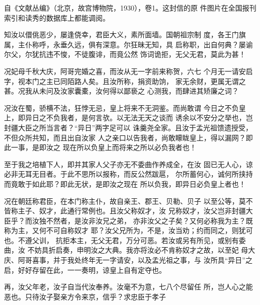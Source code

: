 \par
自《文献丛编》（北京，故宫博物院，1930），卷1。这封信的原%
件图片在全国报刊索引和读秀的数据库上都能调阅。%
\par
{\bookkai 知汝以儇佻恶少，屡逢侥幸，君臣大义，素所面墙。国朝祖宗制}%
{\bookkai 度，各王门旗属，主仆称呼，永垂久远，俱有深意。尔狂昧无知，具}%
{\bookkai 启称职，出自何典？屡谕尔父，尔犹抗违不悛，不徒腹诽，而竟公然}%
{\bookkai 饰词诡拒，无父无君，莫此为甚！}%
\par
{\bookkai 况妃母千秋大庆，阿哥完婚之喜，而汝从无一字前来称贺，六七}%
{\bookkai 个月无一请安启字，视本门之主已同陌路人矣。且汝所称，捐资助饷，}%
{\bookkai 家无余财，更属无谓之甚。况我从未问及汝家囊橐，汝何得以鄙亵之}%
{\bookkai 心测我，而肆进其矫廉之词？}%
\par
{\bookkai 况汝在蜀，骄横不法，狂悖无忌，皇上将来不无洞鉴。而尚敢谓}%
{\bookkai 今日之不负皇上，即异日之不负我者，是何言欤。以无法无天之谈而}%
{\bookkai 诱余以不安分之举也，岂封疆大臣之所当言者？“异日”两字足可以}%
{\bookkai 诛羹尧全家。且汝于孟光祖馈遗授受，不但众所共知，而且出自汝家}%
{\bookkai 人之亲口以告我者，尚敢矇眬皇上，得以漏网？即此一事，是即汝之}%
{\bookkai 现在所以负皇上而将来之所以必负我者也！}%
\par
{\bookkai 至于我之培植下人，即并其家人父子亦无不委曲作养成全，在汝}%
{\bookkai 固已无人心，谅必非无耳无目者。于此不思所以报称，而反公然跋扈，}%
{\bookkai 尔所蓄何心，诚何所挟持而竟敢于如此耶？即此无状，是即汝之现在}%
{\bookkai 所以负我，即异日必负皇上者也！}%
\par
{\bookkai 况在朝廷称君臣，在本门称主仆，故自亲王、郡王、贝勒、贝子}%
{\bookkai 以至公等，莫不皆称主子、奴才，此通行常例也。且汝父称奴才，汝}%
{\bookkai 兄称奴才，汝父岂非封疆大臣乎？而汝独不然者，是汝非汝兄之弟，}%
{\bookkai 亦非汝父之子矣？又何必称我为主？既称为主，又何不可自称奴才}%
{\bookkai 耶？汝父兄所为，不是，汝当劝；约而同之，则犹可也。不遵父训，}%
{\bookkai 抗拒本主，无父无君，万分可恶。若汝或另有所见，或别有委曲，汝}%
{\bookkai 不妨具折启奏，申明汝之大典。我亦将汝必不肯称奴才之故，以至妃}%
{\bookkai 母大庆、阿哥喜事，并于我处终年无一字请安，以及孟光祖之事，与}%
{\bookkai 汝所具“异日”之启，好好存留在此，一一奏明，谅皇上自有定夺也。}%
\par
{\bookkai 再，汝父年老，汝子自当代汝奉养。汝毫不为意，七八个尽留任}%
{\bookkai 所，岂人心之能恶也。只待汝子娶亲方令来京，信乎？求忠臣于孝子}%
